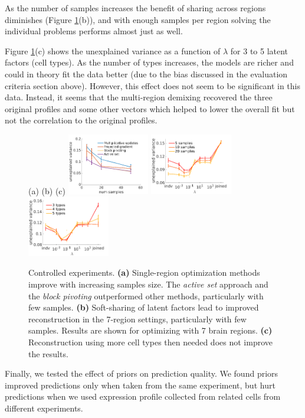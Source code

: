 \documentclass{article} %
\begin{document}
As the number of samples increases the benefit of sharing across regions diminishes (Figure \ref{fig:controlled_exp}(b)), and with enough samples per region solving the individual problems performs almost just as well.

Figure \ref{fig:controlled_exp}(c) shows the unexplained variance as a function of $\lambda$ for 3 to 5 latent factors (cell types). As the number of types increases, the models are richer and could in theory fit the data better (due to the bias discussed in the evaluation criteria section above). However, this effect does not seem to be significant in this data.  Instead, it seems that the multi-region demixing recovered the three original profiles and some other vectors which helped to lower the overall fit but not the correlation to the original profiles. 
\begin{figure}[!hbt]
   (a) \hspace{120pt}(b) \hspace{120pt}(c) \hspace{190pt}
   \centering
     \includegraphics[width=0.32\textwidth]{methods_new}
     \includegraphics[width=0.32\textwidth]{num_samps_new}
     \includegraphics[width=0.32\textwidth]{num_types_new}
    \caption{Controlled experiments. 
    {\bf{(a)}} Single-region optimization methods improve with increasing samples size. The {\em active set} approach and the {\em block pivoting} outperformed other methods, particularly with few samples. {\bf{(b)}} Soft-sharing of latent factors lead to improved reconstruction in the 7-region settings, particularly with few samples. Results are shown for optimizing with 7 brain regions. {\bf{(c)}} Reconstruction using more cell types then needed does not improve the results.} 
    \label{fig:controlled_exp}
\end{figure}
Finally, we tested the effect of priors on prediction quality. We found priors improved predictions only when taken from the same experiment, but hurt predictions when we used expression profile collected from related cells from different experiments. 
\end{document}
